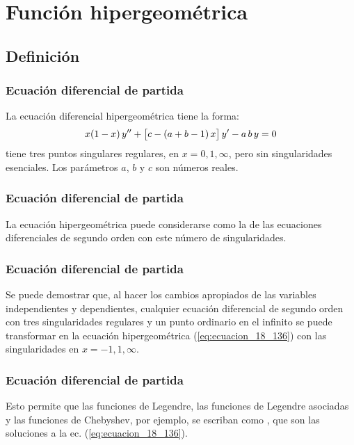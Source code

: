 \documentclass[12pt]{beamer}
\begin{document}
\section{Función hipergeométrica}
\subsection{Definición}

\begin{frame}
\frametitle{Ecuación diferencial de partida}
La ecuación diferencial hipergeométrica tiene la forma:
\pause
\begin{align}
x (1 - x) \, {y}^{\prime \prime} + \big[ c - (a + b - 1) \, x \big] \, {y}^{\prime} -  a \, b \, y = 0
\label{eq:ecuacion_18_136}
\end{align}
tiene tres puntos singulares regulares, en $x = 0, 1, \infty$, pero sin singularidades esenciales. Los parámetros $a$, $b$ y $c$ son números reales.
\end{frame}
\begin{frame}
\frametitle{Ecuación diferencial de partida}
La ecuación hipergeométrica puede considerarse como la  de las ecuaciones diferenciales de segundo orden con este número de singularidades.
\end{frame}
\begin{frame}
\frametitle{Ecuación diferencial de partida}
Se puede demostrar que, al hacer los cambios apropiados de las variables independientes y dependientes, cualquier ecuación diferencial de segundo orden con tres singularidades regulares y un punto ordinario en el infinito se puede transformar en la ecuación hipergeométrica (\ref{eq:ecuacion_18_136}) con las singularidades en $x= -1 , 1, \infty$.
\end{frame}
\begin{frame}
\frametitle{Ecuación diferencial de partida}
Esto permite que las funciones de Legendre, las funciones de Legendre asociadas y las funciones de Chebyshev, por ejemplo, se escriban como , que son las soluciones a la ec. (\ref{eq:ecuacion_18_136}).
\end{frame}
\end{document}
